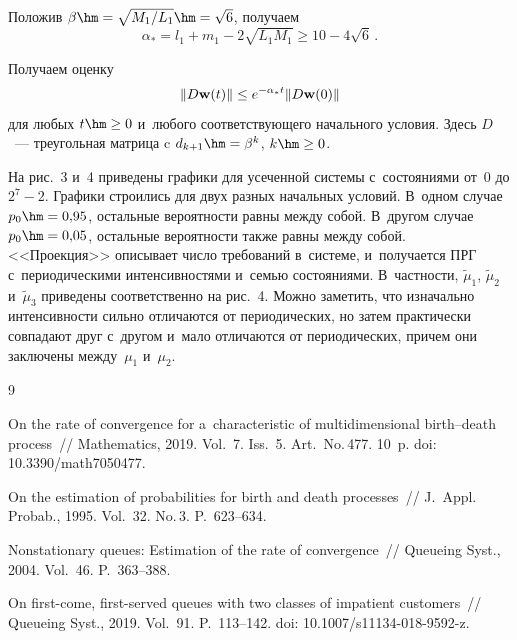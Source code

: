 Положив $\beta\hm= \sqrt{{M_1}/{L_1}} \hm= \sqrt{6}$, получаем 
$$
\alpha_* =l_1+m_1-2\sqrt{L_1M_1}\ge 10-4\sqrt 6\,.
$$

Получаем оценку
\begin{equation*}
\|D{\bf w}(t)\| \le e^{- \alpha_* t}\|D{\bf w}(0)\|
\end{equation*}
для любых $ t  \hm\ge 0$ и~любого соответствующего начального условия.
%
Здесь $D$~--- треугольная матрица c $d_{k+1}\hm=\beta^k$, $k\hm\ge 0 $.


На рис.~3 и~4 приведены 
графики для усеченной системы с~состояниями от~$0$ до $2^7-2$.
Графики строились для двух разных начальных условий. В~одном случае $p_0\hm=0{,}95$, 
остальные вероятности равны между собой. В~другом случае $p_0\hm=0{,}05$, 
остальные вероятности также равны между собой.  <<Проекция>> описывает число 
требований в~системе, и~получается ПРГ с~периодическими интенсивностями и~семью состояниями. 
В~частности, $\tilde{\mu}_1$, $\tilde{\mu}_2$ и~$\tilde{\mu}_3$ приведены  
соответственно  на рис.~4. 
Можно заметить, что изначально интенсивности сильно отличаются от периодических, 
но затем практически совпадают друг с~другом и~мало отличаются от периодических,
причем они заключены между~$\mu_1$ и~$\mu_2$.

    




{\small\frenchspacing
{%
\begin{thebibliography}{9}

On the rate of convergence for a~characteristic of multidimensional birth--death process~/\!\!/ 
Mathematics, 2019. Vol.~7. Iss.~5. Art.\ No.\,477. 10~p.
doi: 10.3390\!/\!math7050477.

 On the estimation of probabilities for birth and death processes~/\!\!/ 
J.~Appl. Probab., 1995. Vol.~32. No.\,3. P.~623--634.


 Nonstationary queues: Estimation of the rate of convergence~/\!\!/ Queueing Syst.,
 2004. Vol.~46. P.~363--388.

On first-come, first-served queues with two classes of impatient customers~/\!\!/ Queueing Syst., 2019. 
Vol.~91. P.~113--142.
doi: 10.1007\!/\!s11134-018-9592-z.
    
     \end{thebibliography}
} }


